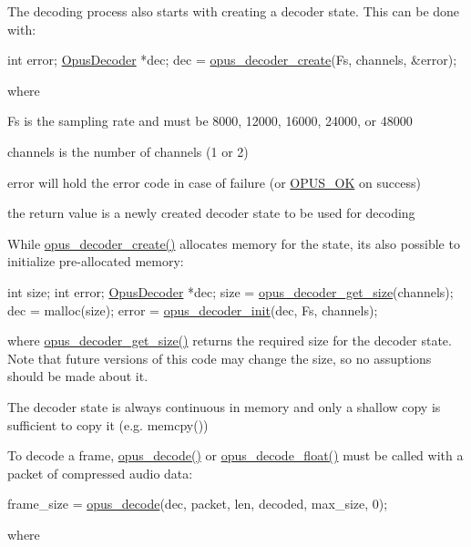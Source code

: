 The decoding process also starts with creating a decoder state. This can be done with\+: 
\begin{DoxyCode}
\textcolor{keywordtype}{int}          error;
\hyperlink{group__opus__decoder_ga401d8579958d36094715a6b90cd159a6}{OpusDecoder} *dec;
dec = \hyperlink{group__opus__decoder_ga6a06f16309dee5883c27223d127c4300}{opus\_decoder\_create}(Fs, channels, &error);
\end{DoxyCode}
 where \begin{DoxyItemize}
\item Fs is the sampling rate and must be 8000, 12000, 16000, 24000, or 48000 \item channels is the number of channels (1 or 2) \item error will hold the error code in case of failure (or \hyperlink{group__opus__errorcodes_gaa44cf8a185e1b5cb940ef63eb4f02d21}{O\+P\+U\+S\+\_\+\+OK} on success) \item the return value is a newly created decoder state to be used for decoding\end{DoxyItemize}
While \hyperlink{group__opus__decoder_ga6a06f16309dee5883c27223d127c4300}{opus\+\_\+decoder\+\_\+create()} allocates memory for the state, it\textquotesingle{}s also possible to initialize pre-\/allocated memory\+: 
\begin{DoxyCode}
\textcolor{keywordtype}{int}          size;
\textcolor{keywordtype}{int}          error;
\hyperlink{group__opus__decoder_ga401d8579958d36094715a6b90cd159a6}{OpusDecoder} *dec;
size = \hyperlink{group__opus__decoder_gaee52cd75f7160fda7a0916d72363940b}{opus\_decoder\_get\_size}(channels);
dec = malloc(size);
error = \hyperlink{group__opus__decoder_ga40746b48a7b1653987a3a6db2ce3a40b}{opus\_decoder\_init}(dec, Fs, channels);
\end{DoxyCode}
 where \hyperlink{group__opus__decoder_gaee52cd75f7160fda7a0916d72363940b}{opus\+\_\+decoder\+\_\+get\+\_\+size()} returns the required size for the decoder state. Note that future versions of this code may change the size, so no assuptions should be made about it.

The decoder state is always continuous in memory and only a shallow copy is sufficient to copy it (e.\+g. memcpy())

To decode a frame, \hyperlink{group__opus__decoder_ga3df1ea406cd9d23a63aed181903d3e5e}{opus\+\_\+decode()} or \hyperlink{group__opus__decoder_gafe994758c0d6fa49cd38d63331d47bd4}{opus\+\_\+decode\+\_\+float()} must be called with a packet of compressed audio data\+: 
\begin{DoxyCode}
frame\_size = \hyperlink{group__opus__decoder_ga3df1ea406cd9d23a63aed181903d3e5e}{opus\_decode}(dec, packet, len, decoded, max\_size, 0);
\end{DoxyCode}
 where

